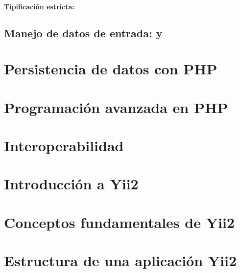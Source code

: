 \documentclass[a4paper,11pt,spanish]{sphinxmanual}
\begin{document}
\subsection{Tipificación estricta: }
\label{\detokenize{conceptos-basicos-de-php:tipificacion-estricta-declare-strict-types-1}}

\chapter{Manejo de datos de entrada:  y }
\label{\detokenize{conceptos-basicos-de-php:manejo-de-datos-de-entrada-get-y-post}}

\part{Persistencia de datos con PHP}
\label{\detokenize{persistencia-de-datos-con-php:persistencia-de-datos-con-php}}\label{\detokenize{persistencia-de-datos-con-php::doc}}

\part{Programación avanzada en PHP}
\label{\detokenize{programacion-avanzada-en-php:programacion-avanzada-en-php}}\label{\detokenize{programacion-avanzada-en-php::doc}}

\part{Interoperabilidad}
\label{\detokenize{interoperabilidad:interoperabilidad}}\label{\detokenize{interoperabilidad::doc}}

\part{Introducción a Yii2}
\label{\detokenize{introduccion-a-yii2:introduccion-a-yii2}}\label{\detokenize{introduccion-a-yii2::doc}}

\part{Conceptos fundamentales de Yii2}
\label{\detokenize{conceptos-fundamentales-de-yii2:conceptos-fundamentales-de-yii2}}\label{\detokenize{conceptos-fundamentales-de-yii2::doc}}

\part{Estructura de una aplicación Yii2}
\label{\detokenize{estructura-de-una-aplicacion-yii2:estructura-de-una-aplicacion-yii2}}\label{\detokenize{estructura-de-una-aplicacion-yii2::doc}}
\end{document}
